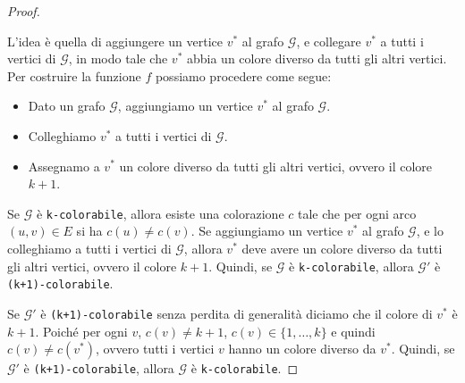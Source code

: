\begin{proof}
\begin{figure}[H]
    \end{figure}
    L'idea è quella di aggiungere un vertice $v^*$ al grafo $\mathcal{G}$, e collegare $v^*$ a tutti i vertici
    di $\mathcal{G}$, in modo tale che $v^*$ abbia un colore diverso da tutti gli altri vertici.
    Per costruire la funzione $f$ possiamo procedere come segue:
    \begin{itemize}
        \item Dato un grafo $\mathcal{G}$, aggiungiamo un vertice $v^*$ al grafo $\mathcal{G}$.
        \item Colleghiamo $v^*$ a tutti i vertici di $\mathcal{G}$.
        \item Assegnamo a $v^*$ un colore diverso da tutti gli altri vertici, ovvero il colore $k+1$.
    \end{itemize}
    Se $\mathcal{G}$ è \texttt{k-colorabile}, allora esiste una colorazione $c$ tale che per ogni arco
    $(u,v) \in E$ si ha $c(u) \neq c(v)$. Se aggiungiamo un vertice $v^*$ al grafo $\mathcal{G}$, e lo colleghiamo
    a tutti i vertici di $\mathcal{G}$, allora $v^*$ deve avere un colore diverso da tutti gli altri vertici, ovvero
    il colore $k+1$. Quindi, se $\mathcal{G}$ è \texttt{k-colorabile}, allora $\mathcal{G'}$ è \texttt{(k+1)-colorabile}.
    
    Se $\mathcal{G}'$ è \texttt{(k+1)-colorabile} senza perdita di generalità diciamo che il colore di $v^*$ è $k+1$.
    Poiché per ogni $v$, $c(v) \neq k+1$, $c(v) \in \{1,\dots,k\}$ e quindi $c(v) \neq c(v^*)$, ovvero tutti i vertici $v$ hanno un colore diverso
    da $v^*$. Quindi, se $\mathcal{G'}$ è \texttt{(k+1)-colorabile},
    allora $\mathcal{G}$ è \texttt{k-colorabile}.
\end{proof}